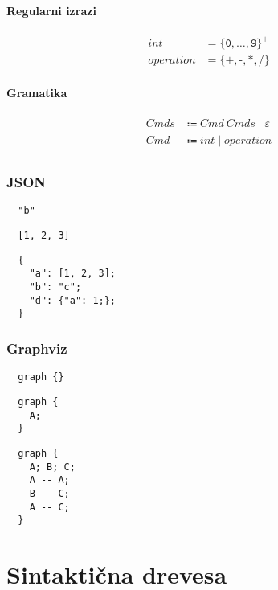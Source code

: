 \documentclass{report}
\newcommand{\Null}{\varepsilon}
\newcommand{\Char}[1]{\texttt{#1}}
\newcommand{\Spc}{\ }
\newcommand{\Union}{\mathrel{|}}
\newcommand{\KleenePlus}[1]{#1^+}
\newcommand{\Arrow}{\Coloneq}
\newcommand{\NT}[1]{{#1}}
\newcommand{\T}[1]{{#1}}
\begin{document}
\subsubsection*{Regularni izrazi}
\begin{equation*}
  \begin{aligned}
    \T{int} &= \KleenePlus{\{\Char{0}, \dots, \Char{9}\}}\\
    \T{operation} &= \{\Char{+}, \Char{-}, \Char{*}, \Char{/}\}
  \end{aligned}
\end{equation*}

\subsubsection*{Gramatika}
\begin{equation*}
  \begin{aligned}
    \NT{Cmds} &\Arrow \NT{Cmd} \Spc \NT{Cmds} \Union \Null \\
    \NT{Cmd} &\Arrow \T{int} \Union \T{operation}\\
  \end{aligned}
\end{equation*}

\subsection{JSON}
\begin{verbatim}
  "b"
\end{verbatim}
\begin{verbatim}
  [1, 2, 3]
\end{verbatim}
\begin{verbatim}
  {
    "a": [1, 2, 3];
    "b": "c";
    "d": {"a": 1;};
  }
\end{verbatim}

\subsection{Graphviz}
\begin{verbatim}
  graph {}
\end{verbatim}
\begin{verbatim}
  graph {
    A;
  }
\end{verbatim}
\begin{verbatim}
  graph {
    A; B; C;
    A -- A;
    B -- C;
    A -- C;
  }
\end{verbatim}


\chapter{Sintaktična drevesa}
\end{document}
